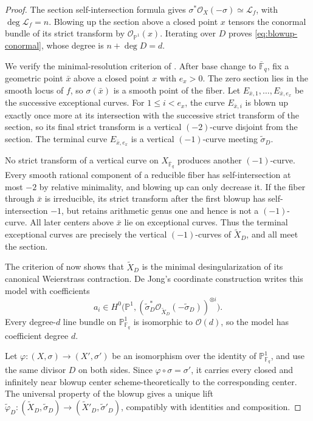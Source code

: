 \documentclass[a4paper,12pt]{amsart}
\theoremstyle{definition}
\newcommand{\Fb}{\mathbb{F}}
\newcommand{\Pb}{\mathbb{P}}
\begin{document}
\begin{proof}
The section self-intersection formula gives $\sigma^*\mathcal O_X(-\sigma)\simeq\mathcal L_f$, with $\deg\mathcal L_f=n$.  Blowing up the section above a closed point $x$ tensors the conormal bundle of its strict transform by $\mathcal O_{\Pb^1}(x)$.  Iterating over $D$ proves \eqref{eq:blowup-conormal}, whose degree is $n+\deg D=d$.

We verify the minimal-resolution criterion of \cite[Section~4.7]{dJ2}.  After base change to $\overline{\Fb}_q$, fix a geometric point $\bar x$ above a closed point $x$ with $e_x>0$.  The zero section lies in the smooth locus of $f$, so $\sigma(\bar x)$ is a smooth point of the fiber.  Let $E_{\bar x,1},\ldots,E_{\bar x,e_x}$ be the successive exceptional curves.  For $1\leq i<e_x$, the curve $E_{\bar x,i}$ is blown up exactly once more at its intersection with the successive strict transform of the section, so its final strict transform is a vertical $(-2)$-curve disjoint from the section.  The terminal curve $E_{\bar x,e_x}$ is a vertical $(-1)$-curve meeting $\widetilde\sigma_D$.

No strict transform of a vertical curve on $X_{\overline{\Fb}_q}$ produces another $(-1)$-curve.  Every smooth rational component of a reducible fiber has self-intersection at most $-2$ by relative minimality, and blowing up can only decrease it.  If the fiber through $\bar x$ is irreducible, its strict transform after the first blowup has self-intersection $-1$, but retains arithmetic genus one and hence is not a $(-1)$-curve.  All later centers above $\bar x$ lie on exceptional curves.  Thus the terminal exceptional curves are precisely the vertical $(-1)$-curves of $\widetilde X_D$, and all meet the section.

The criterion of \cite[Section~4.7]{dJ2} now shows that $\widetilde X_D$ is the minimal desingularization of its canonical Weierstrass contraction.  De Jong's coordinate construction \cite[Sections~4.5--4.6]{dJ2} writes this model with coefficients
\[
a_i\in H^0\bigl(\Pb^1,(\widetilde\sigma_D^*\mathcal O_{\widetilde X_D}(-\widetilde\sigma_D))^{\otimes i}\bigr).
\]
Every degree-$d$ line bundle on $\Pb^1_{\Fb_q}$ is isomorphic to $\mathcal O(d)$, so the model has coefficient degree $d$.

Let $\varphi\colon(X,\sigma)\to(X',\sigma')$ be an isomorphism over the identity of $\Pb^1_{\Fb_q}$, and use the same divisor $D$ on both sides.  Since $\varphi\circ\sigma=\sigma'$, it carries every closed and infinitely near blowup center scheme-theoretically to the corresponding center.  The universal property of the blowup gives a unique lift $\widetilde\varphi_D\colon(\widetilde X_D,\widetilde\sigma_D)\to(\widetilde X'_D,\widetilde\sigma'_D)$, compatibly with identities and composition.


\end{proof}
\end{document}
